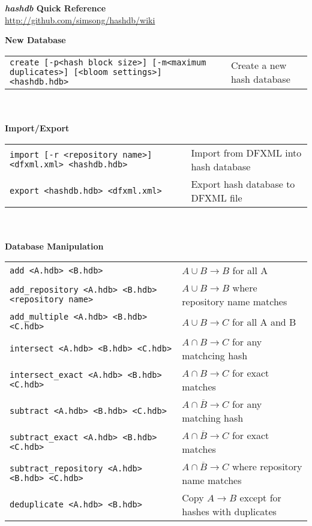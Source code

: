 \documentclass[12pt]{article}
\newcommand{\hdb}{\emph{hashdb}\xspace}
\begin{document}
\begin{center}
\textbf{\Large \hdb Quick Reference} \\
\url{http://github.com/simsong/hashdb/wiki}
\end{center}

\textbf{New Database} \\
\begin{tabular}{p{4.5 in} l}
\small\texttt{create [-p<hash block size>] [-m<maximum duplicates>] [<bloom settings>] <hashdb.hdb>} &
Create a new hash database \\
\end{tabular}
\\
\\
\textbf{Import/Export} \\
\begin{tabular}{p{4.5 in} l}
\small\texttt{import [-r <repository name>] <dfxml.xml> <hashdb.hdb>} &
Import from DFXML into hash database \\
\small\texttt{export <hashdb.hdb> <dfxml.xml>} &
Export hash database to DFXML file \\
\end{tabular}
\\
\\
\textbf{Database Manipulation} \\
\begin{tabular}{p{4 in} l}
\small\texttt{add <A.hdb> <B.hdb>} & $A \cup B \rightarrow B$ for all A \\
\small\texttt{add\_repository <A.hdb> <B.hdb> <repository name>} & $A \cup B \rightarrow B$ where repository name matches \\
\small\texttt{add\_multiple <A.hdb> <B.hdb> <C.hdb>} & $A \cup B \rightarrow C$ for all A and B \\
\small\texttt{intersect <A.hdb> <B.hdb> <C.hdb>} & $A \cap B \rightarrow C$ for any matchcing hash\\
\small\texttt{intersect\_exact <A.hdb> <B.hdb> <C.hdb>} & $A \cap B \rightarrow C$ for exact matches\\
\small\texttt{subtract <A.hdb> <B.hdb> <C.hdb>} & $A \cap \overline B \rightarrow C$ for any matching hash \\
\small\texttt{subtract\_exact <A.hdb> <B.hdb> <C.hdb>} & $A \cap \overline B \rightarrow C$ for exact matches \\
\small\texttt{subtract\_repository <A.hdb> <B.hdb> <C.hdb>} & $A \cap \overline B \rightarrow C$ where repository name matches \\
\small\texttt{deduplicate <A.hdb> <B.hdb>} & Copy $A \rightarrow B$ except for hashes with duplicates \\
\end{tabular}
\end{document}
